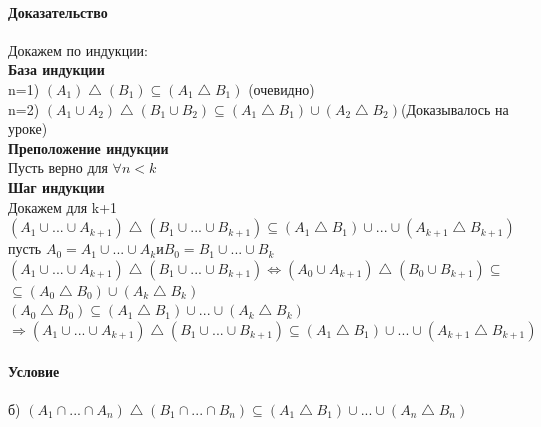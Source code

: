 \documentclass[a4paper,12pt]{article}
\begin{document}
\paragraph*{Доказательство}
Докажем по индукции:\\
\textbf{База индукции}\\
 n=1)  $(A_1) \bigtriangleup (B_1) \subseteq (A_1 \bigtriangleup B_1) $ (очевидно)\\
 n=2)  $(A_1 \cup  A_2) \bigtriangleup (B_1 \cup B_2) \subseteq (A_1 \bigtriangleup B_1) \cup (A_2 \bigtriangleup B_2) $(Доказывалось на уроке)\\
 \textbf{Преположение индукции}\\
 Пусть верно для $\forall n < k$\\
 \textbf{Шаг индукции}\\
 Докажем для k+1\\
 $(A_1 \cup ... \cup A_{k+1}) \bigtriangleup (B_1 \cup ... \cup B_{k+1}) \subseteq (A_1 \bigtriangleup B_1) \cup ... \cup (A_{k+1} \bigtriangleup B_{k+1}) $\\
 пусть $ A_0 = A_1 \cup ... \cup A_k и B_0 = B_1 \cup ... \cup B_k$\\
 $(A_1 \cup ... \cup A_{k+1}) \bigtriangleup (B_1 \cup ... \cup B_{k+1}) \Leftrightarrow (A_0 \cup A_{k+1}) \bigtriangleup (B_0 \cup B_{k+1}) \subseteq $ \\
$ \subseteq (A_0 \bigtriangleup B_0) \cup (A_k \bigtriangleup B_k)$\\
$(A_0 \bigtriangleup B_0) \subseteq  (A_1 \bigtriangleup B_1) \cup ... \cup (A_k \bigtriangleup B_k)$\\
$\Rightarrow (A_1 \cup ... \cup A_{k+1}) \bigtriangleup (B_1 \cup ... \cup B_{k+1}) \subseteq (A_1 \bigtriangleup B_1) \cup ... \cup (A_{k+1} \bigtriangleup B_{k+1}) $

\paragraph*{Условие}
б) $(A_1 \cap ... \cap A_n) \bigtriangleup (B_1 \cap ... \cap B_n) \subseteq (A_1 \bigtriangleup B_1) \cup ... \cup (A_n \bigtriangleup B_n) $
\end{document}
